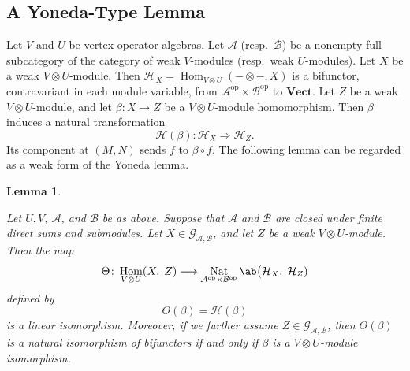 \documentclass[12pt, english]{article}
\numberwithin{equation}{section}
\DeclareMathOperator{\Hom}{Hom}
\DeclareMathOperator{\opp}{op}
\DeclareMathOperator{\Nat}{Nat}
\theoremstyle{plain}
\newtheorem{lemma}{Lemma}[section]
\theoremstyle{definition}
\theoremstyle{remark}
\begin{document}
	\subsection{ A Yoneda-Type Lemma }
	
	Let $V$ and $U$ be vertex operator algebras.
	Let $\mathcal{A}$ (resp.\ $\mathcal{B}$) be a nonempty full subcategory of the category of weak $V$-modules (resp.\ weak $U$-modules).
	Let $X$ be a weak $V\otimes U$-module.
	Then $\mathcal{H}_X=\Hom_{V\otimes U}(-\otimes -, X)$ is a bifunctor, contravariant in each module variable, from $\mathcal{A}^{\opp}\times\mathcal{B}^{\opp}$ to $\mathbf{Vect}$.
	Let $Z$ be a weak $V\otimes U$-module, and let $\beta\colon X \to Z$ be a $V\otimes U$-module homomorphism.
	Then $\beta$ induces a natural transformation
	\[
	\mathcal{H}(\beta) \colon \mathcal{H}_X \Rightarrow \mathcal{H}_Z.
	\]
	Its component at $(M,N)$ sends $f$ to $\beta\circ f$.
	The following lemma can be regarded as a weak form of the Yoneda lemma.
	
	\begin{lemma} \label{lem:external-tensor-density}
		
		Let $U, V$, $\mathcal{A}$, and $\mathcal{B}$ be as above.
		Suppose that $\mathcal{A}$ and $\mathcal{B}$ are closed under finite direct sums and submodules.
		Let $X \in \mathcal{G}_{\mathcal{A}, \mathcal{B}}$, and let $Z$ be a weak $V\otimes U$-module.
		Then the map
		\[
		\Theta\colon \Hom_{V\otimes U}(X, \; Z) \longrightarrow
		\Nat_{\mathcal{A}^{\opp}\times\mathcal{B}^{\opp}} \ab\big(\mathcal{H}_X, \; \mathcal{H}_Z)
		\]
		defined by
		\[
		\Theta(\beta) = \mathcal{H}(\beta)
		\]
		is a linear isomorphism.
		Moreover, if we further assume $Z \in \mathcal{G}_{\mathcal{A}, \mathcal{B}}$,
		then $\Theta(\beta)$ is a natural isomorphism of bifunctors if and only if $\beta$ is a $V \otimes U$-module isomorphism.  
	\end{lemma}
	
\end{document}
